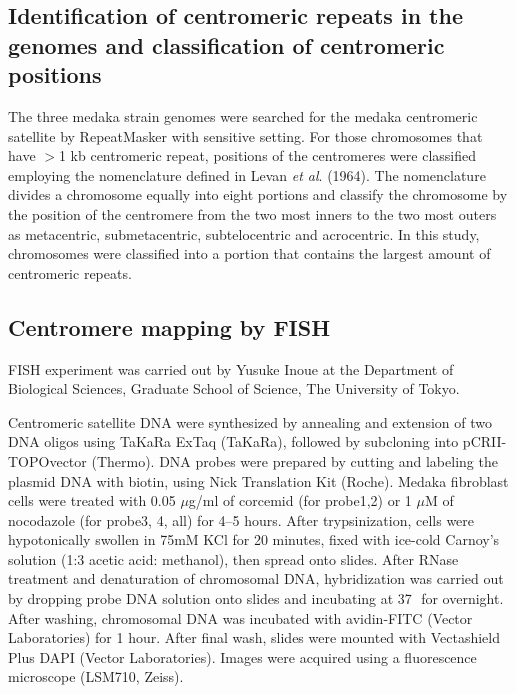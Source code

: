 \subsection*{Identification of centromeric repeats in the genomes and classification of centromeric positions}
  The three medaka strain genomes were searched for the medaka centromeric satellite by RepeatMasker with sensitive setting. For those chromosomes that have $>$1 kb centromeric repeat, positions of the centromeres were classified employing the nomenclature defined in Levan \textit{et al}. (1964). The nomenclature divides a chromosome equally into eight portions and classify the chromosome by the position of the centromere from the two most inners to the two most outers as metacentric, submetacentric, subtelocentric and acrocentric. In this study, chromosomes were classified into a portion that contains the largest amount of centromeric repeats.


\subsection*{Centromere mapping by FISH}
  FISH experiment was carried out by Yusuke Inoue at the Department of Biological Sciences, Graduate School of Science, The University of Tokyo.

  Centromeric satellite DNA were synthesized by annealing and extension of two DNA oligos using TaKaRa ExTaq (TaKaRa), followed by subcloning into pCR\texttrademark II-TOPO\textregistered vector (Thermo). DNA probes were prepared by cutting and labeling the plasmid DNA with biotin, using Nick Translation Kit (Roche). Medaka fibroblast cells were treated with 0.05 $\mu$g/ml of corcemid (for probe1,2) or 1 $\mu$M of nocodazole (for probe3, 4, all) for 4--5 hours. After trypsinization, cells were hypotonically swollen in 75mM KCl for 20 minutes, fixed with ice-cold Carnoy's solution (1:3 acetic acid: methanol), then spread onto slides. After RNase treatment and denaturation of chromosomal DNA, hybridization was carried out by dropping probe DNA solution onto slides and incubating at 37\,\celsius\, for overnight. After washing, chromosomal DNA was incubated with avidin-FITC (Vector Laboratories) for 1 hour. After final wash, slides were mounted with Vectashield Plus DAPI (Vector Laboratories). Images were acquired using a fluorescence microscope (LSM710, Zeiss).


